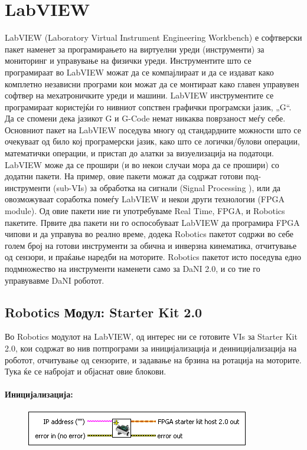 \documentclass{article}
\begin{document}
\section{LabVIEW}
LabVIEW (Laboratory Virtual Instrument Engineering Workbench) е софтверски пакет наменет за програмирањето на виртуелни уреди (инструменти) за мониторинг и управување на физички уреди. Инструментите што се програмираат во LabVIEW можат да се компајлираат и да се издават како комплетно независни програми кои можат да се монтираат како главен управувен софтвер на мехатроничките уреди и машини.  LabVIEW инструментите се програмираат користејќи го нивниот сопствен графички програмски јазик, „G“. Да се спомени дека јазикот G и G-Code немат никаква поврзаност меѓу себе.
Основниот пакет на LabVIEW поседува многу од стандардните можности што се очекуваат од било кој програмерски јазик, како што се логички/булови операции, математички операции, и пристап до алатки за визуелизација на податоци. 
LabVIEW може да се прошири (и во некои случаи мора да се прошири) со додатни пакети. На пример, овие пакети можат да содржат готови под-инструменти (sub-VIs) за обработка на сигнали (Signal Processing ), или да овозможуваат соработка помеѓу LabVIEW и некои други технологии (FPGA module). Од овие пакети ние ги употребуваме Real Time, FPGA, и Robotics пакетите. Првите два пакети ни го оспособуваат LabVIEW да програмира FPGA чипови и да управува во реално време, додека Robotics пакетот содржи во себе голем број на готови инструменти за обична и инверзна кинематика, отчитување од сензори, и праќање наредби на моторите. 
Robotics пакетот исто поседува едно подмножество на инструменти наменети само за DaNI 2.0, и со тие го управувавме DaNI роботот.  
\subsection{Robotics Модул: Starter Kit 2.0}
Во Robotics модулот на LabVIEW, од интерес ни се готовите VIs за Starter Kit 2.0, кои содржат во нив потпрограми за иницијализација и деиницијализација на роботот, отчитување од сензорите, и задавање на брзина на ротација на моторите. Тука ќе се набројат и објаснат овие блокови.
\paragraph{Иницијализација:\\}

\begin{figure}[h]
\includegraphics[width=0.45\linewidth]{init.png} 
\raggedright
\end{figure}
\end{document}
